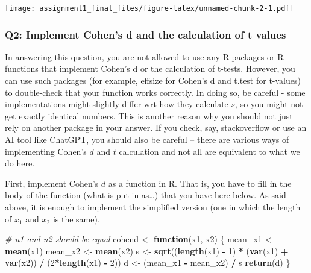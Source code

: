 \documentclass[
]{article}
\newenvironment{Shaded}{\begin{snugshade}}{\end{snugshade}}
\newcommand{\CommentTok}[1]{\textcolor[rgb]{0.56,0.35,0.01}{\textit{#1}}}
\newcommand{\ControlFlowTok}[1]{\textcolor[rgb]{0.13,0.29,0.53}{\textbf{#1}}}
\newcommand{\DecValTok}[1]{\textcolor[rgb]{0.00,0.00,0.81}{#1}}
\newcommand{\FunctionTok}[1]{\textcolor[rgb]{0.13,0.29,0.53}{\textbf{#1}}}
\newcommand{\NormalTok}[1]{#1}
\newcommand{\OtherTok}[1]{\textcolor[rgb]{0.56,0.35,0.01}{#1}}
\newcommand{\SpecialCharTok}[1]{\textcolor[rgb]{0.81,0.36,0.00}{\textbf{#1}}}
\begin{document}
\texttt{[image: assignment1\_final\_files/figure-latex/unnamed-chunk-2-1.pdf]}

\hypertarget{q2-implement-cohens-d-and-the-calculation-of-t-values}{%
\subsubsection{Q2: Implement Cohen's d and the calculation of t
values}\label{q2-implement-cohens-d-and-the-calculation-of-t-values}}

In answering this question, you are not allowed to use any R packages or
R functions that implement Cohen's d or the calculation of t-tests.
However, you can use such packages (for example, effsize for Cohen's d
and t.test for t-values) to double-check that your function works
correctly. In doing so, be careful - some implementations might slightly
differ wrt how they calculate \(s\), so you might not get exactly
identical numbers. This is another reason why you should not just rely
on another package in your answer. If you check, say, stackoverflow or
use an AI tool like ChatGPT, you should also be careful -- there are
various ways of implementing Cohen's \(d\) and \(t\) calculation and not
all are equivalent to what we do here.

First, implement Cohen's \(d\) as a function in R. That is, you have to
fill in the body of the function (what is put in as\ldots) that you have
here below. As said above, it is enough to implement the simplified
version (one in which the length of \(x_1\) and \(x_2\) is the same).

\begin{Shaded}
\begin{Highlighting}[]
\CommentTok{\# n1 and n2 should be equal}
\NormalTok{cohend }\OtherTok{\textless{}{-}} \ControlFlowTok{function}\NormalTok{(x1, x2) \{}
\NormalTok{  mean\_x1 }\OtherTok{\textless{}{-}} \FunctionTok{mean}\NormalTok{(x1)}
\NormalTok{  mean\_x2 }\OtherTok{\textless{}{-}} \FunctionTok{mean}\NormalTok{(x2)}
\NormalTok{  s }\OtherTok{\textless{}{-}} \FunctionTok{sqrt}\NormalTok{((}\FunctionTok{length}\NormalTok{(x1) }\SpecialCharTok{{-}} \DecValTok{1}\NormalTok{) }\SpecialCharTok{*}\NormalTok{ (}\FunctionTok{var}\NormalTok{(x1) }\SpecialCharTok{+} \FunctionTok{var}\NormalTok{(x2)) }\SpecialCharTok{/}\NormalTok{ (}\DecValTok{2}\SpecialCharTok{*}\FunctionTok{length}\NormalTok{(x1) }\SpecialCharTok{{-}} \DecValTok{2}\NormalTok{))}
\NormalTok{  d }\OtherTok{\textless{}{-}}\NormalTok{ (mean\_x1 }\SpecialCharTok{{-}}\NormalTok{ mean\_x2) }\SpecialCharTok{/}\NormalTok{ s}
  \FunctionTok{return}\NormalTok{(d)}
\NormalTok{\}}
\end{Highlighting}
\end{Shaded}
\end{document}
